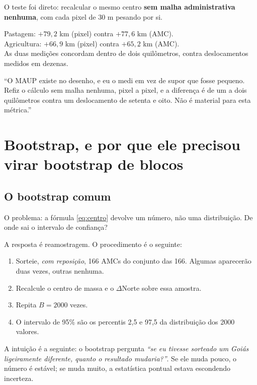 O teste foi direto: recalcular o mesmo centro \textbf{sem malha administrativa
nenhuma}, com cada pixel de 30 m pesando por si.

\begin{ancora}
Pastagem: $+79{,}2$ km (pixel) contra $+77{,}6$ km (AMC). \\
Agricultura: $+66{,}9$ km (pixel) contra $+65{,}2$ km (AMC). \\
As duas medições concordam dentro de dois quilômetros, contra deslocamentos
medidos em dezenas.
\end{ancora}

\begin{nabanca}
``O MAUP existe no desenho, e eu o medi em vez de supor que fosse pequeno.
Refiz o cálculo sem malha nenhuma, pixel a pixel, e a diferença é de um a dois
quilômetros contra um deslocamento de setenta e oito. Não é material para esta
métrica.''
\end{nabanca}

\chapter{Bootstrap, e por que ele precisou virar bootstrap de blocos}
\label{cap:bootstrap}

\section{O bootstrap comum}

O problema: a fórmula \ref{eq:centro} devolve um número, não uma distribuição.
De onde sai o intervalo de confiança?

A resposta é reamostragem. O procedimento é o seguinte:

\begin{enumerate}
\item Sorteie, \emph{com reposição}, 166 AMCs do conjunto das 166. Algumas
aparecerão duas vezes, outras nenhuma.
\item Recalcule o centro de massa e o $\Delta$Norte sobre essa amostra.
\item Repita $B = 2000$ vezes.
\item O intervalo de 95\% são os percentis 2,5 e 97,5 da distribuição dos 2000
valores.
\end{enumerate}

A intuição é a seguinte: o bootstrap pergunta \emph{``se eu tivesse sorteado um
Goiás ligeiramente diferente, quanto o resultado mudaria?''}. Se ele muda pouco,
o número é estável; se muda muito, a estatística pontual estava escondendo
incerteza.

